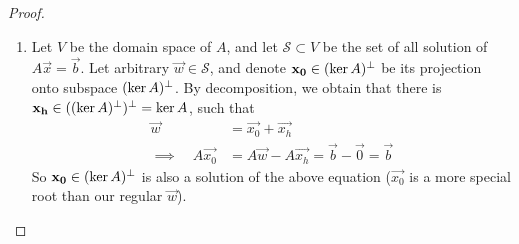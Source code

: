 \begin{proof}
  \text{}
  \begin{enumerate}[label={(\alph*)}]
    \item 
      Let $V$ be the domain space of $A$, and let $\mathcal S\subset V$
      be the set of all solution of $A\vec{x}=\vec{b}$. 
      Let arbitrary $\vec{w}\in\mathcal S$, and denote 
      $\mathbf{x_0}\in(\ker A)^\perp$ be its projection onto subspace 
      $(\ker A)^\perp$. By decomposition, we obtain that there is 
      $\mathbf{x_h}\in ((\ker A)^\perp)^\perp=\ker A$, such that
      \begin{align*}
        \vec{w}&=\vec{x_0}+\vec{x_h} \\ \implies\quad 
        A\vec{x_0}&=A\vec{w}-A\vec{x_h}=\vec{b}-\vec{0}=\vec{b}
      \end{align*}
      So $\mathbf{x_0}\in(\ker A)^\perp$ is also a solution of the above 
      equation ($\vec{x_0}$ is a more special root than our 
      regular $\vec{w}$). 


\end{enumerate}
\end{proof}
